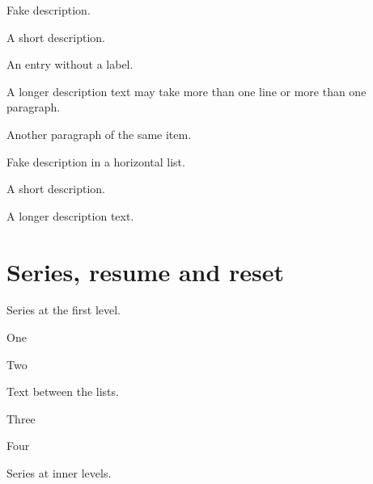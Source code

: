 \documentclass{article}
\begin{document}
\newlength{\descitemwd}

Fake description.

\begin{enumext}[label={}, labelwidth=\descitemwd, font=\bfseries,
                noitemsep, topsep=3pt]
  \item[Some] A short description.
  \item[] An entry without a label.
  \item[Something long] A longer description text may take more than one
    line or more than one paragraph.

    Another paragraph of the same item.
\end{enumext}

Fake description in a horizontal list.

\begin{enumext*}[label={}, labelwidth=\descitemwd, font=\bfseries,
                 noitemsep, topsep=3pt]
  \item[Some] A short description.
  \item[Something long] A longer description text.
\end{enumext*}

\section{Series, resume and reset}

Series at the first level.

\begin{enumext}[series=one]
  \item One
  \item Two
\end{enumext}

Text between the lists.

\begin{enumext}[resume=one]
  \item Three
  \item Four
\end{enumext}

Series at inner levels.
\end{document}
